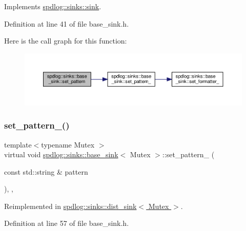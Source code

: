 Implements \hyperlink{classspdlog_1_1sinks_1_1sink_a7e5cfd4b683c8bfa8fbd602d7f409632}{spdlog\+::sinks\+::sink}.



Definition at line 41 of file base\+\_\+sink.\+h.

Here is the call graph for this function\+:
\nopagebreak
\begin{figure}[H]
\begin{center}
\leavevmode
\includegraphics[width=350pt]{classspdlog_1_1sinks_1_1base__sink_a2b0a0b95f1e7272b443de67b46914152_cgraph}
\end{center}
\end{figure}
\mbox{\label{classspdlog_1_1sinks_1_1base__sink_a56bc5fc8e03dc0aeb6679856ffee7fb4}} 
\subsubsection{\texorpdfstring{set\+\_\+pattern\+\_\+()}{set\_pattern\_()}}
{\footnotesize\ttfamily template$<$typename Mutex $>$ \\
virtual void \hyperlink{classspdlog_1_1sinks_1_1base__sink}{spdlog\+::sinks\+::base\+\_\+sink}$<$ Mutex $>$\+::set\+\_\+pattern\+\_\+ (\begin{DoxyParamCaption}\item[{const std\+::string \&}]{pattern }\end{DoxyParamCaption})\hspace{0.3cm}{\ttfamily [inline]}, {\ttfamily [protected]}, {\ttfamily [virtual]}}



Reimplemented in \hyperlink{classspdlog_1_1sinks_1_1dist__sink_a6f77a1e2f45ed85ee8ed554cf7442d4e}{spdlog\+::sinks\+::dist\+\_\+sink$<$ Mutex $>$}.



Definition at line 57 of file base\+\_\+sink.\+h.

